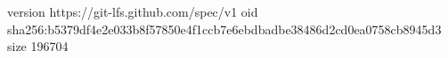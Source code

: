 version https://git-lfs.github.com/spec/v1
oid sha256:b5379df4e2e033b8f57850e4f1ccb7e6ebdbadbe38486d2cd0ea0758cb8945d3
size 196704
